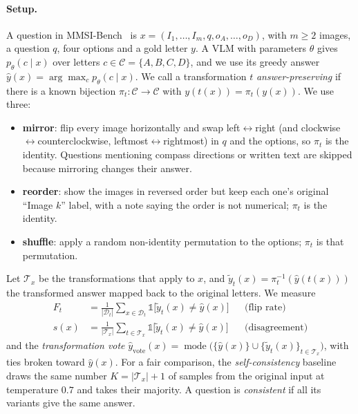 \paragraph{Setup.}
A question in MMSI-Bench~\citep{yang2025mmsi} is $x=(I_1,\dots,I_m,q,o_A,\dots,o_D)$, with
$m\ge 2$ images, a question $q$, four options and a gold letter $y$. A VLM with parameters
$\theta$ gives $p_\theta(c\mid x)$ over letters $c\in\mathcal{C}=\{A,B,C,D\}$, and we use its
greedy answer $\hat y(x)=\arg\max_c p_\theta(c\mid x)$. We call a transformation $t$
\emph{answer-preserving} if there is a known bijection $\pi_t:\mathcal{C}\to\mathcal{C}$ with
$y(t(x))=\pi_t(y(x))$. We use three:
\begin{itemize}
  \item \textbf{mirror}: flip every image horizontally and swap left$\leftrightarrow$right
  (and clockwise$\leftrightarrow$counterclockwise, leftmost$\leftrightarrow$rightmost) in $q$ and
  the options, so $\pi_t$ is the identity. Questions mentioning compass directions or written
  text are skipped because mirroring changes their answer.
  \item \textbf{reorder}: show the images in reversed order but keep each one's original
  ``Image $k$'' label, with a note saying the order is not numerical; $\pi_t$ is the identity.
  \item \textbf{shuffle}: apply a random non-identity permutation to the options; $\pi_t$ is that
  permutation.
\end{itemize}
Let $\mathcal{T}_x$ be the transformations that apply to $x$, and $\tilde y_t(x)=\pi_t^{-1}(\hat
y(t(x)))$ the transformed answer mapped back to the original letters. We measure
\begin{align}
  F_t &= \frac{1}{|\mathcal{D}_t|}\sum_{x\in\mathcal{D}_t}\mathbb{1}\big[\tilde y_t(x)\neq\hat y(x)\big]
  && \text{(flip rate)}\\
  s(x) &= \frac{1}{|\mathcal{T}_x|}\sum_{t\in\mathcal{T}_x}\mathbb{1}\big[\tilde y_t(x)\neq\hat y(x)\big]
  && \text{(disagreement)}
\end{align}
and the \emph{transformation vote}
$\hat y_{\mathrm{vote}}(x)=\operatorname{mode}\big(\{\hat y(x)\}\cup\{\tilde y_t(x)\}_{t\in\mathcal{T}_x}\big)$,
with ties broken toward $\hat y(x)$. For a fair comparison, the \emph{self-consistency}
baseline~\citep{wang2023selfconsistency} draws the same number $K=|\mathcal{T}_x|+1$ of samples
from the original input at temperature $0.7$ and takes their majority. A question is
\emph{consistent} if all its variants give the same answer.

